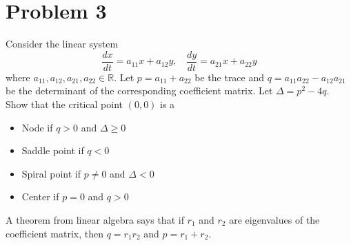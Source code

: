 \documentclass{article}
\theoremstyle{definition}
\begin{document}
\section*{Problem 3}
    \begin{mdframed}[]
        Consider the linear system
        \[
            \frac{dx}{dt} = a_{11}x + a_{12}y, \ \ \ \ \frac{dy}{dt} = a_{21}x + a_{22}y
        \]
        where $a_{11}, a_{12}, a_{21}, a_{22} \in \mathbb{R}$. Let $p = a_{11} + a_{22}$
        be the trace and $q = a_{11}a_{22} - a_{12}a_{21}$ be the determinant of the corresponding
        coefficient matrix. Let $\Delta = p^2 - 4q$. Show that the critical point $(0,0)$ is a 
        \begin{itemize}
            \item Node if $q > 0$ and $\Delta \geq 0$ \\
            \item Saddle point if $q < 0$ \\
            \item Spiral point if $p \neq 0$ and $\Delta < 0$ \\
            \item Center if $p = 0$ and $q > 0$
        \end{itemize}
        A theorem from linear algebra says that if $r_1$ and $r_2$ are eigenvalues of the coefficient matrix,
        then $q = r_1r_2$ and $p = r_1 + r_2$.
    \end{mdframed}
\end{document}
